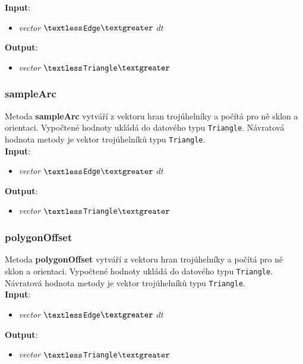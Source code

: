 \documentclass[a4paper, 12pt]{article}
\begin{document}
\textbf{Input}:
\begin{itemize}
\item \textsl{vector} $\textless$\texttt{Edge}$\textgreater$ $dt$
\end{itemize}

\textbf{Output}:
\begin{itemize}
\item \textsl{vector} $\textless$\texttt{Triangle}$\textgreater$
\end{itemize}

\subsubsection*{sampleArc}
Metoda \textbf{sampleArc} vytváří z vektoru hran trojúhelníky a počítá pro ně sklon a orientaci. Vypočtené hodnoty ukládá do datového typu \texttt{Triangle}. Návratová hodnota metody je vektor trojúhelníků typu \texttt{Triangle}.\\

\textbf{Input}:
\begin{itemize}
\item \textsl{vector} $\textless$\texttt{Edge}$\textgreater$ $dt$
\end{itemize}

\textbf{Output}:
\begin{itemize}
\item \textsl{vector} $\textless$\texttt{Triangle}$\textgreater$
\end{itemize}

\subsubsection*{polygonOffset}
Metoda \textbf{polygonOffset} vytváří z vektoru hran trojúhelníky a počítá pro ně sklon a orientaci. Vypočtené hodnoty ukládá do datového typu \texttt{Triangle}. Návratová hodnota metody je vektor trojúhelníků typu \texttt{Triangle}.\\

\textbf{Input}:
\begin{itemize}
\item \textsl{vector} $\textless$\texttt{Edge}$\textgreater$ $dt$
\end{itemize}

\textbf{Output}:
\begin{itemize}
\item \textsl{vector} $\textless$\texttt{Triangle}$\textgreater$
\end{itemize}
\end{document}
